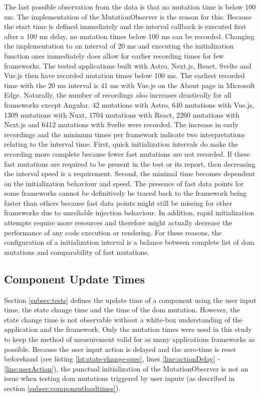 \documentclass[a4paper, 10pt]{article}
\begin{document}
The last possible observation from the data is that no mutation time is below 100 ms.
The implementation of the MutationObserver is the reason for this.
Because the start time is defined immediately and the interval callback is executed first after a 100 ms delay, no mutation times below 100 ms can be recorded.
Changing the implementation to an interval of 20 ms and executing the initialization function ones immediately does allow for earlier recording times for few frameworks.
The tested applications built with Astro, Next.js, React, Svelte and Vue.js then have recorded mutation times below 100 ms.
The earliest recorded time with the 20 ms interval is 41 ms with Vue.js on the About page in Microsoft Edge.
Naturally, the number of recordings also increases drastically for all frameworks except Angular.
42 mutations with Astro, 640 mutations with Vue.js, 1309 mutations with Nuxt, 1704 mutations with React, 2260 mutations with Next.js and 6412 mutations with Svelte were recorded.
The increase in early recordings and the minimum times per framework indicate two interpretations relating to the interval time.
First, quick initialization intervals do make the recording more complete because fewer fast mutations are not recorded.
If these fast mutations are required to be present in the test or its report, then decreasing the interval speed is a requirement.
Second, the minimal time becomes dependent on the initialization behaviour and speed.
The presence of fast data points for some frameworks cannot be definitively be traced back to the framework being faster than others because fast data points might still be missing for other frameworks due to unreliable injection behaviour.
In addition, rapid initialization attempts require more resources and therefore might actually decrease the performance of any code execution or rendering.
For these reasons, the configuration of a initialization interval is a balance between complete list of \acrshort{dom} mutations and comparability of fast mutations.

\subsection{Component Update Times}\label{subsec:componentupdatetimes}

Section \ref{subsec:tests} defines the update time of a component using the user input time, the state change time and the time of the \acrshort{dom} mutation.
However, the state change time is not observable without a white-box understanding of the application and the framework.
Only the mutation times were used in this study to keep the method of measurement valid for as many applications frameworks as possible.
Because the user input action is delayed and the zero-time is reset beforehand (see listing \ref{lst:state-change-spec}, lines \ref{line:actionDelay} - \ref{line:userAction}), the punctual initialization of the MutationObserver is not an issue when testing \acrshort{dom} mutations triggered by user inputs (as described in section \ref{subsec:componentloadtimes}).
\end{document}
